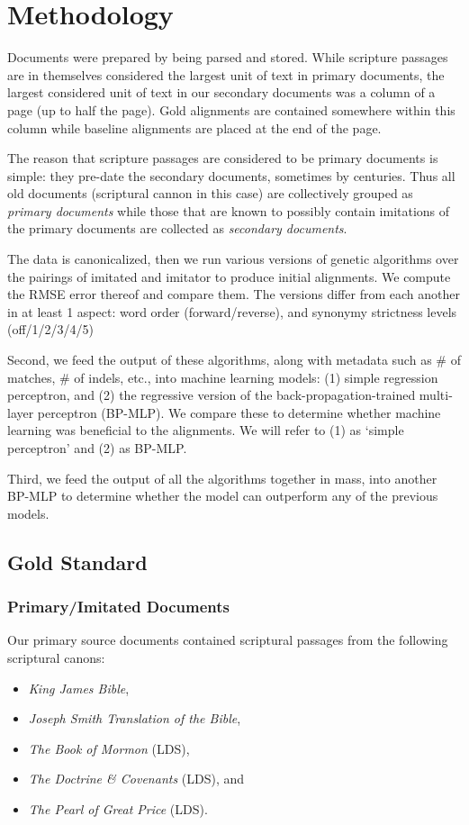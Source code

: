 \section {Methodology}
Documents were prepared by being parsed and stored. While scripture passages are in themselves considered the largest unit of text in primary documents, the largest considered unit of text in our secondary documents was a column of a page (up to half the page). Gold alignments are contained somewhere within this column while baseline alignments are placed at the end of the page.

The reason that scripture passages are considered to be primary documents is simple: they pre-date the secondary documents, sometimes by centuries. Thus all old documents (scriptural cannon in this case) are collectively grouped as \textit{primary documents} while those that are known to possibly contain imitations of the primary documents are collected as \textit{secondary documents}.

The data is canonicalized, then we run various versions of genetic algorithms over the pairings of imitated and imitator to produce initial alignments. We compute the RMSE error thereof and compare them. The versions differ from each another in at least 1 aspect: word order (forward/reverse), and synonymy strictness levels (off/1/2/3/4/5)

Second, we feed the output of these algorithms, along with metadata such as \# of matches, \# of indels, etc., into machine learning models: (1) simple regression perceptron, and (2) the regressive version of the back-propagation-trained multi-layer perceptron (BP-MLP). We compare these to determine whether machine learning was beneficial to the alignments. We will refer to (1) as `simple perceptron' and (2) as BP-MLP.

Third, we feed the output of all the algorithms together in mass, into another BP-MLP to determine whether the model can outperform any of the previous models.

\subsection{Gold Standard}
\subsubsection{Primary/Imitated Documents}
Our primary source documents contained scriptural passages from the following scriptural canons:
	\begin{itemize}
		\item \textit{King James Bible},
		\item \textit{Joseph Smith Translation of the Bible},
		\item \textit{The Book of Mormon} (LDS),
		\item \textit{The Doctrine \& Covenants} (LDS), and
		\item \textit{The Pearl of Great Price} (LDS). 
	\end{itemize}

